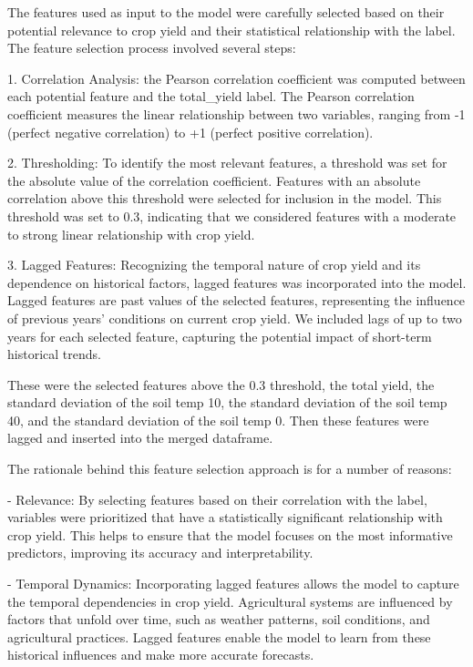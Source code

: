 \documentclass[a4paper, 12pt]{article}
\begin{document}
The features used as input to the model were carefully selected based on their potential relevance to crop yield and their statistical relationship with the label. The feature selection process involved several steps:

1. Correlation Analysis: the Pearson correlation coefficient was computed between each potential feature and the total\_yield label. The Pearson correlation coefficient measures the linear relationship between two variables, ranging from -1 (perfect negative correlation) to +1 (perfect positive correlation).

2. Thresholding: To identify the most relevant features, a threshold was set for the absolute value of the correlation coefficient. Features with an absolute correlation above this threshold were selected for inclusion in the model. This threshold was set to 0.3, indicating that we considered features with a moderate to strong linear relationship with crop yield.

3. Lagged Features: Recognizing the temporal nature of crop yield and its dependence on historical factors, lagged features was incorporated into the model. Lagged features are past values of the selected features, representing the influence of previous years' conditions on current crop yield. We included lags of up to two years for each selected feature, capturing the potential impact of short-term historical trends.

These were the selected features above the 0.3 threshold, the total yield, the standard deviation of the soil temp 10, the standard deviation of the soil temp 40, and the standard deviation of the soil temp 0. Then these features were lagged and inserted into the merged dataframe.

The rationale behind this feature selection approach is for a number of reasons:

- Relevance: By selecting features based on their correlation with the label, variables were prioritized that have a statistically significant relationship with crop yield. This helps to ensure that the model focuses on the most informative predictors, improving its accuracy and interpretability.

- Temporal Dynamics: Incorporating lagged features allows the model to capture the temporal dependencies in crop yield. Agricultural systems are influenced by factors that unfold over time, such as weather patterns, soil conditions, and agricultural practices. Lagged features enable the model to learn from these historical influences and make more accurate forecasts.
\end{document}
